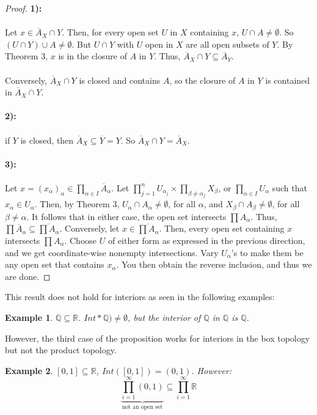 \documentclass{article}
\newcommand{\R}{\mathbb{R}}
\newcommand{\Q}{\mathbb{Q}}
\newtheorem{example}{Example}
\begin{document}
 \begin{proof}
 \textbf{1):}\\
 \\
 Let $x\in\overline{A}_X\cap Y$. Then, for every open set $U$ in $X$ containing $x$, $U\cap A\neq \emptyset$. So $(U\cap Y)\cup A\neq \emptyset$. But $U\cap Y$ with $U$ open in $X$ are all open subsets of $Y$. By Theorem 3, $x$ is in the closure of $A$ in $Y$. Thus, $\overline{A}_X\cap Y\subseteq \overline{A}_Y$.\\
 \\
 Conversely, $\overline{A}_X\cap Y$ is closed and contains $A$, so the closure of $A$ in $Y$ is contained in $\overline{A}_X\cap Y$.\\
 \\
 \textbf{2):}\\
 \\
 if $Y$ is closed, then $\overline{A}_X\subseteq \overline{Y}=Y$. So $\overline{A}_X\cap Y = \overline{A}_X$.\\
 \\
 \textbf{3):}\\
 \\
 Let $x=(x_\alpha)_\alpha\in \displaystyle\prod_{\alpha\in I}\overline{A}_\alpha$. Let $\displaystyle\prod_{j=1}^nU_{\alpha_j}\times \prod_{\beta\neq \alpha_j}X_\beta$, or $\displaystyle\prod_{\alpha\in I}U_\alpha$ such that $x_\alpha\in U_\alpha$. Then, by Theorem 3, $U_\alpha\cap A_\alpha\neq \emptyset$, for all $\alpha$, and $X_\beta\cap A_\beta\neq\emptyset$, for all $\beta\neq\alpha$. It follows that in either case, the open set intersects $\displaystyle\prod A_\alpha$. Thus, $\displaystyle\prod \overline{A}_\alpha\subseteq \overline{\prod A_\alpha}$. Conversely, let $x\in \overline{\displaystyle\prod A_\alpha}$. Then, every open set containing $x$ intersects $\displaystyle\prod A_\alpha$. Choose $U$ of either form as expressed in the previous direction, and we get coordinate-wise nonempty intersections. Vary $U_\alpha$'s to make them be any open set that contains $x_\alpha$. You then obtain the reverse inclusion, and thus we are done.      
 \end{proof}
 \noindent This result does not hold for interiors as seen in the following examples:
 \begin{example}
 $\Q\subseteq \R$. $Int*\Q)\neq \emptyset$,  but the interior of $\Q$ in $\Q$ is $\Q$. 
 \end{example}
 However, the third case of the proposition works for interiors in the box topology but not the product topology. 
 \begin{example}
 $[0,1]\subseteq \R$, $Int([0,1])=(0,1)$. However:
 $$\displaystyle\underbrace{\prod_{i=1}^\infty (0,1)}_{\text{not an open set}}\subseteq \prod_{i=1}^\infty\R$$
 \end{example}
\end{document}
